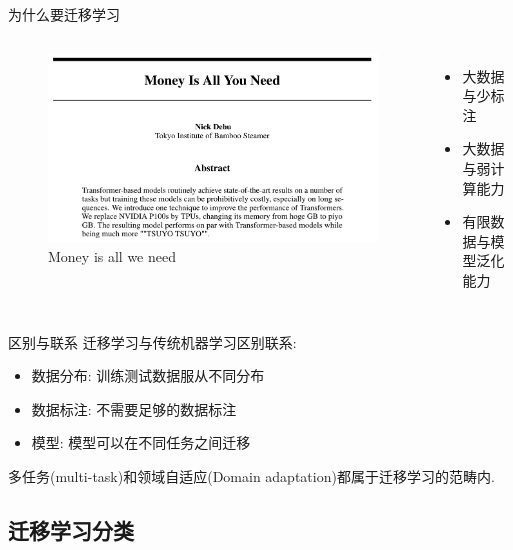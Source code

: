 \begin{frame}{为什么要迁移学习}
    \begin{columns}

        \begin{figure}
            \centering
            \includegraphics[width=\textwidth]{pic/pic04.png}
            \caption{Money is all we need}
            \label{fig:04}
        \end{figure}
        
        \begin{itemize}
            \item 大数据与少标注
            \item 大数据与弱计算能力
            \item 有限数据与模型泛化能力
        \end{itemize}

    \end{columns}
\end{frame}

\begin{frame}{区别与联系}
    迁移学习与传统机器学习区别联系:
    \begin{itemize}
        \item 数据分布: 训练测试数据服从不同分布
        \item 数据标注: 不需要足够的数据标注
        \item 模型: 模型可以在不同任务之间迁移
    \end{itemize}

    多任务(multi-task)和领域自适应(Domain adaptation)都属于迁移学习的范畴内. 
    
\end{frame}


\subsection{迁移学习分类}


